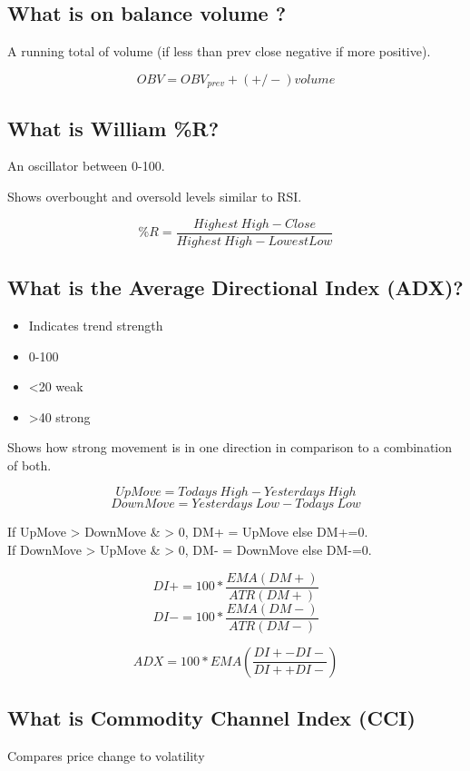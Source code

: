 \documentclass[11pt]{scrartcl} %
\begin{document}
\subsection{What is on balance volume ?}

A running total of volume (if less than prev close negative if more positive).

\[ OBV = OBV_{prev} + (+/-)volume\]

\subsection{What is William \%R?}

An oscillator between 0-100.

Shows overbought and oversold levels similar to RSI.

\[ \%R = \frac{Highest\:High - Close}{Highest\:High - Lowest Low} \]

\subsection{What is the Average Directional Index (ADX)?}

\begin{itemize}
	\item Indicates trend strength
	\item 0-100
	\item <20 weak
	\item >40 strong 
\end{itemize}

Shows how strong movement is in one direction in comparison to a combination of both.

\[ UpMove = Todays\:High - Yesterdays\:High \]
\[ DownMove = Yesterdays\:Low - Todays\:Low \]

If UpMove > DownMove \& > 0, DM+ = UpMove else DM+=0.\\
If DownMove > UpMove \& > 0, DM- = DownMove else DM-=0.

\[ DI+ = 100 * \frac{EMA(DM+)}{ATR(DM+)} \]
\[ DI- = 100 * \frac{EMA(DM-)}{ATR(DM-)} \]

\[ ADX = 100 * EMA(\frac{DI+ - DI-}{DI+ + DI-}) \]

\subsection{What is Commodity Channel Index (CCI)}

Compares price change to volatility
\end{document}
